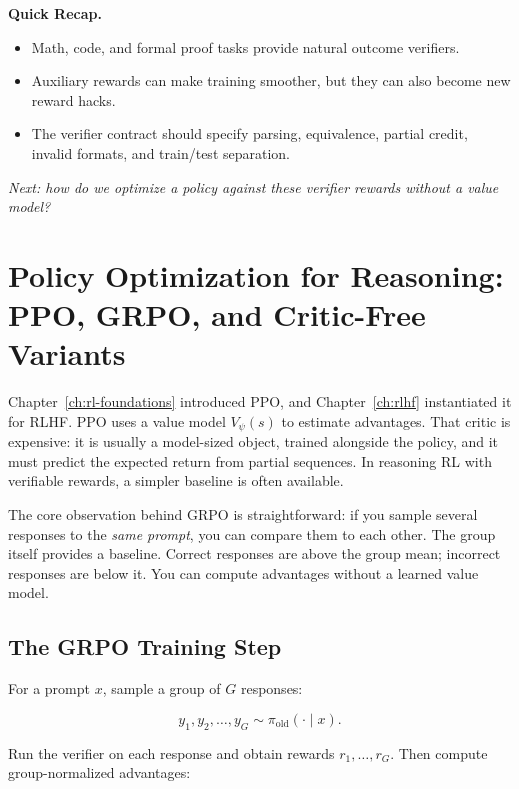 \begin{quickrecap}
\textbf{Quick Recap.}
\begin{itemize}[nosep,leftmargin=1.5em]
  \item Math, code, and formal proof tasks provide natural outcome verifiers.
  \item Auxiliary rewards can make training smoother, but they can also become new reward hacks.
  \item The verifier contract should specify parsing, equivalence, partial credit, invalid formats, and train/test separation.
\end{itemize}
\textit{Next: how do we optimize a policy against these verifier rewards without a value model?}
\end{quickrecap}


\section[Policy Optimization for Reasoning]{Policy Optimization for Reasoning: PPO, GRPO, and Critic-Free Variants}
\label{sec:grpo}

Chapter~\ref{ch:rl-foundations} introduced PPO, and Chapter~\ref{ch:rlhf} instantiated it for RLHF. PPO uses a value model $V_\psi(s)$ to estimate advantages. That critic is expensive: it is usually a model-sized object, trained alongside the policy, and it must predict the expected return from partial sequences. In reasoning RL with verifiable rewards, a simpler baseline is often available.

The core observation behind GRPO is straightforward: if you sample several responses to the \emph{same prompt}, you can compare them to each other. The group itself provides a baseline. Correct responses are above the group mean; incorrect responses are below it. You can compute advantages without a learned value model.

\subsection{The GRPO Training Step}

For a prompt $x$, sample a group of $G$ responses:

\[
y_1, y_2, \ldots, y_G \sim \pi_{\text{old}}(\cdot \mid x).
\]

Run the verifier on each response and obtain rewards $r_1,\ldots,r_G$. Then compute group-normalized advantages:

